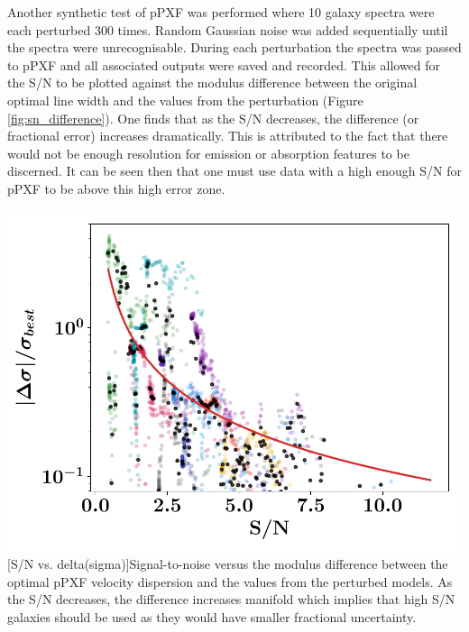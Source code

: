 \documentclass[12pt, twocolumn]{revtex4}    %
\begin{document}
Another synthetic test of pPXF was performed where 10 galaxy spectra were each perturbed 300 times. Random Gaussian noise was added sequentially until the spectra were unrecognisable. During each perturbation the spectra was passed to pPXF and all associated outputs were saved and recorded. This allowed for the S/N to be plotted against the modulus difference between the original optimal line width and the values from the perturbation (Figure \ref{fig:sn_difference}). One finds that as the S/N decreases, the difference (or fractional error) increases dramatically. This is attributed to the fact that there would not be enough resolution for emission or absorption features to be discerned. It can be seen then that one must use data with a high enough S/N for pPXF to be above this high error zone.


\begin{center}
\includegraphics[width=1.0\linewidth]{data/frac_error_vs_sn_ppxf}
[S/N vs. delta(sigma)]{Signal-to-noise versus the modulus difference between the optimal pPXF velocity dispersion and the values from the perturbed models. As the S/N decreases, the difference increases manifold which implies that high S/N galaxies should be used as they would have smaller fractional uncertainty.}
\label{fig:ppxf_sn_difference}
\end{center}
\end{document}
